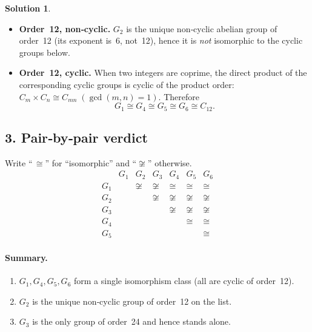 \documentclass[12pt]{article}
\theoremstyle{definition} %
\newtheorem{solution}{Solution}
\theoremstyle{plain} %
\begin{document}
\begin{solution}
\begin{itemize}
  \item \textbf{Order~12, non‑cyclic.}\;
        \(G_2\) is the unique non‑cyclic abelian group of order 12
        (its exponent is~6, not~12), hence it is
        \emph{not} isomorphic to the cyclic groups below.

  \item \textbf{Order~12, cyclic.}\;
        When two integers are coprime, the direct product of the
        corresponding cyclic groups is cyclic of the product order:
        \(
          C_m\times C_n\cong C_{mn}\;(\gcd(m,n)=1).
        \)
        Therefore
        \[
          G_1\cong G_4\cong G_5\cong G_6\cong C_{12}.
        \]
\end{itemize}

\subsection*{3.\;  Pair‑by‑pair verdict}
Write “\,\(\cong\)” for “isomorphic” and “\(\not\cong\)” otherwise.
\[
\begin{array}{c|cccccc}
        & G_1 & G_2 & G_3 & G_4 & G_5 & G_6\\\hline
  G_1   &      & \not\cong & \not\cong & \cong & \cong & \cong\\
  G_2   &      &           & \not\cong & \not\cong & \not\cong & \not\cong\\
  G_3   &      &           &           & \not\cong & \not\cong & \not\cong\\
  G_4   &      &           &           &          & \cong & \cong\\
  G_5   &      &           &           &          &        & \cong
\end{array}
\]

\paragraph{Summary.}
\begin{enumerate}[label=\alph*)]
  \item \(G_1,G_4,G_5,G_6\) form a single isomorphism class (all are cyclic of order 12).
  \item \(G_2\) is the unique non‑cyclic group of order 12 on the list.
  \item \(G_3\) is the only group of order 24 and hence stands alone.
\end{enumerate}
\end{solution}
\end{document}
